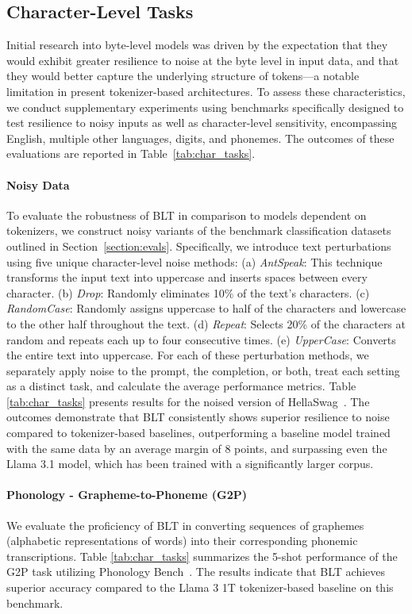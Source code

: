 \subsection{Character-Level Tasks}

Initial research into byte-level models was driven by the expectation that they would exhibit greater resilience to noise at the byte level in input data, and that they would better capture the underlying structure of tokens—a notable limitation in present tokenizer-based architectures. To assess these characteristics, we conduct supplementary experiments using benchmarks specifically designed to test resilience to noisy inputs as well as character-level sensitivity, encompassing English, multiple other languages, digits, and phonemes. The outcomes of these evaluations are reported in Table~\ref{tab:char_tasks}.

\paragraph{Noisy Data} To evaluate the robustness of {\textsc BLT} in comparison to models dependent on tokenizers, we construct noisy variants of the benchmark classification datasets outlined in Section~\ref{section:evals}. Specifically, we introduce text perturbations using five unique character-level noise methods: (a) \textit{AntSpeak}: This technique transforms the input text into uppercase and inserts spaces between every character. (b) \textit{Drop}: Randomly eliminates 10\% of the text's characters. (c) \textit{RandomCase}: Randomly assigns uppercase to half of the characters and lowercase to the other half throughout the text. (d) \textit{Repeat}: Selects 20\% of the characters at random and repeats each up to four consecutive times. (e) \textit{UpperCase}: Converts the entire text into uppercase. For each of these perturbation methods, we separately apply noise to the prompt, the completion, or both, treat each setting as a distinct task, and calculate the average performance metrics. Table \ref{tab:char_tasks} presents results for the noised version of HellaSwag~\citep{Eval_hellaswag}. The outcomes demonstrate that {\textsc BLT} consistently shows superior resilience to noise compared to tokenizer-based baselines, outperforming a baseline model trained with the same data by an average margin of 8 points, and surpassing even the Llama 3.1 model, which has been trained with a significantly larger corpus.

\paragraph{Phonology - Grapheme-to-Phoneme (G2P)} We evaluate the proficiency of {\textsc BLT} in converting sequences of graphemes (alphabetic representations of words) into their corresponding phonemic transcriptions. Table \ref{tab:char_tasks} summarizes the 5-shot performance of the G2P task utilizing Phonology Bench~\citep{suvarna2024phonologybench}. The results indicate that {\textsc BLT} achieves superior accuracy compared to the Llama 3 1T tokenizer-based baseline on this benchmark.

